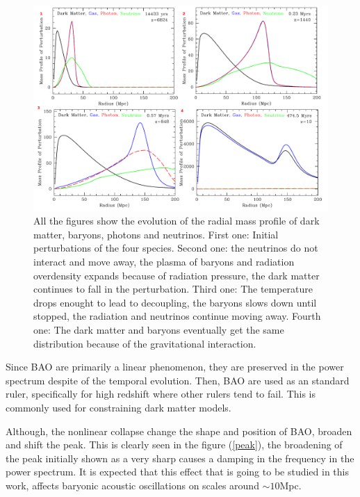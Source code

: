  
\begin{figure}[htbp]
       \centering
               \includegraphics[width=1.0\textwidth]{Images/chapter2/BAOS2_2.png}
       \caption{\small All the figures show the evolution of the radial mass profile of dark matter,  baryons, photons
       and neutrinos. First one: Initial perturbations of the four species. 
       Second one: the neutrinos do not interact and move away, 
       the plasma of baryons and radiation overdensity expands because of radiation pressure, the dark matter
       continues to fall in the perturbation. Third one: The temperature drops enought to lead to decoupling, 
      the baryons slows down until stopped, the radiation and neutrinos continue moving away. Fourth one:  
      The dark matter and baryons eventually get the same distribution because of the gravitational interaction.}
       \label{DBM}
 \end{figure}

Since BAO are primarily a linear phenomenon, they are preserved in the power spectrum despite of 
the temporal evolution. Then,  BAO are used as an standard ruler, specifically for high redshift where other rulers tend to fail. 
This is commonly used for constraining dark matter models. 


Although, the nonlinear collapse change the shape and position of BAO, broaden and shift the 
peak. This is clearly seen in the figure (\ref{peak}), the broadening of the peak initially shown as a very sharp causes 
a damping in the frequency in the power spectrum. It is expected that this effect that is going to be studied in this work, affects baryonic 
acoustic oscillations on scales around $\sim 10$Mpc.

